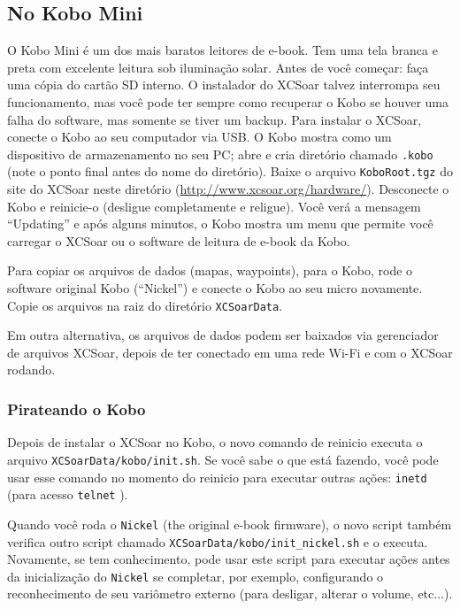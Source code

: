 \subsection*{No Kobo Mini}

O Kobo Mini é um dos mais baratos leitores de e-book.  Tem uma tela branca e preta com excelente leitura sob iluminação solar.  
Antes de você começar: faça uma cópia do cartão SD interno.  O instalador do XCSoar talvez interrompa seu funcionamento, mas você pode ter sempre como recuperar o Kobo se houver uma falha do software, mas somente se tiver um backup.
Para instalar o XCSoar, conecte o Kobo ao seu computador via USB. O Kobo mostra como um dispositivo de armazenamento no seu PC; abre e cria diretório chamado \texttt{.kobo} (note o ponto final antes do nome do diretório).  Baixe o arquivo \texttt{KoboRoot.tgz} do site do XCSoar neste diretório (\url{http://www.xcsoar.org/hardware/}). Desconecte o Kobo e reinicie-o (desligue completamente e religue).  Você verá a mensagem “Updating” e após alguns minutos, o Kobo mostra um menu que permite você carregar o XCSoar ou o software de leitura de e-book da Kobo.

Para copiar os arquivos de dados (mapas, waypoints), para o Kobo, rode o software original Kobo (“Nickel”) e conecte o Kobo ao seu micro novamente.  Copie os arquivos na raiz do diretório  \texttt{XCSoarData}.

Em outra alternativa, os arquivos de dados podem ser baixados via gerenciador de arquivos XCSoar, depois de ter conectado em uma rede Wi-Fi e com o XCSoar rodando.

\subsubsection{Pirateando o Kobo}

Depois de instalar o XCSoar no Kobo, o novo comando de reinicio executa o arquivo \texttt{XCSoarData/kobo/init.sh}.  Se você sabe o que está fazendo, você pode usar esse comando no momento do reinicio para executar outras ações: \texttt{inetd} (para acesso \texttt{telnet}
).

Quando você roda o \texttt{Nickel} (the original e-book firmware), o novo script também verifica outro script chamado \texttt{XCSoarData/kobo/init\_nickel.sh} e o executa.  Novamente, se tem conhecimento, pode usar este script para executar ações antes da inicialização do \texttt{Nickel} se completar, por exemplo, configurando o reconhecimento de seu variômetro externo (para desligar, alterar o volume, etc...).

